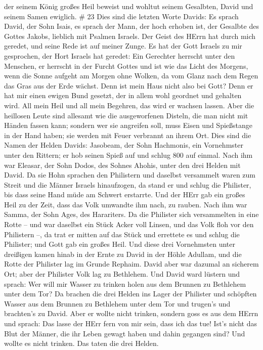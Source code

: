  der seinem König großes Heil beweist und wohltut seinem
Gesalbten, David und seinem Samen ewiglich. \# 23  Dies sind
die letzten Worte Davids: Es sprach David, der Sohn Isais, es sprach der
Mann, der hoch erhoben ist, der Gesalbte des Gottes Jakobs, lieblich mit
Psalmen Israels.  Der Geist des HErrn hat durch mich
geredet, und seine Rede ist auf meiner Zunge.  Es hat der
Gott Israels zu mir gesprochen, der Hort Israels hat geredet: Ein
Gerechter herrscht unter den Menschen, er herrscht in der Furcht Gottes
 und ist wie das Licht des Morgens, wenn die Sonne aufgeht
am Morgen ohne Wolken, da vom Glanz nach dem Regen das Gras aus der Erde
wächst.  Denn ist mein Haus nicht also bei Gott? Denn er hat
mir einen ewigen Bund gesetzt, der in allem wohl geordnet und gehalten
wird. All mein Heil und all mein Begehren, das wird er wachsen lassen.
 Aber die heillosen Leute sind allesamt wie die
ausgeworfenen Disteln, die man nicht mit Händen fassen kann;
 sondern wer sie angreifen soll, muss Eisen und Spießstange
in der Hand haben; sie werden mit Feuer verbrannt an ihrem Ort.
 Dies sind die Namen der Helden Davids: Jasobeam, der Sohn
Hachmonis, ein Vornehmster unter den Rittern; er hob seinen Spieß auf
und schlug 800 auf einmal.  Nach ihm war Eleasar, der Sohn
Dodos, des Sohnes Ahohis, unter den drei Helden mit David. Da sie Hohn
sprachen den Philistern und daselbst versammelt waren zum Streit und die
Männer Israels hinaufzogen,  da stand er und schlug die
Philister, bis dass seine Hand müde am Schwert erstarrte. Und der HErr
gab ein großes Heil zu der Zeit, dass das Volk umwandte ihm nach, zu
rauben.  Nach ihm war Samma, der Sohn Ages, des Harariters.
Da die Philister sich versammelten in eine Rotte -- und war daselbst ein
Stück Acker voll Linsen, und das Volk floh vor den Philistern --,
 da trat er mitten auf das Stück und errettete es und
schlug die Philister; und Gott gab ein großes Heil.  Und
diese drei Vornehmsten unter dreißigen kamen hinab in der Ernte zu David
in der Höhle Adullam, und die Rotte der Philister lag im Grunde Rephaim.
 David aber war dazumal an sicherem Ort; aber der Philister
Volk lag zu Bethlehem.  Und David ward lüstern und sprach:
Wer will mir Wasser zu trinken holen aus dem Brunnen zu Bethlehem unter
dem Tor?  Da brachen die drei Helden ins Lager der
Philister und schöpften Wasser aus dem Brunnen zu Bethlehem unter dem
Tor und trugen's und brachten's zu David. Aber er wollte nicht trinken,
sondern goss es aus dem HErrn  und sprach: Das lasse der
HErr fern von mir sein, dass ich das tue! Ist's nicht das Blut der
Männer, die ihr Leben gewagt haben und dahin gegangen sind? Und wollte
es nicht trinken. Das taten die drei Helden.

